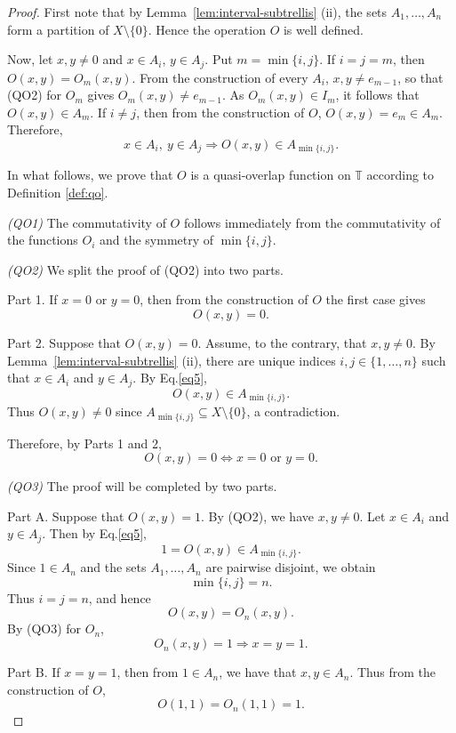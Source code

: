 \documentclass[preprint,12pt]{elsarticle}
\begin{document}
\begin{proof}
First note that by Lemma~\ref{lem:interval-subtrellis} (ii), the sets
$A_1,\ldots,A_n$ form a partition of $X\setminus\{0\}$.
Hence the operation $O$ is well defined.

Now, let $x,y\neq0$ and
$x\in A_i$, $y\in A_j$. Put
$
m=\min\{i,j\}.
$
If $i=j=m$, then
$
O(x,y)=O_m(x,y).
$
From the construction of every $A_i$, $x,y\neq e_{m-1}$, so that (QO2) for $O_m$ gives
$
O_m(x,y)\neq e_{m-1}.
$
As $O_m(x,y)\in I_m$, it follows that
$
O(x,y)\in A_m.
$
If $i\neq j$, then from the construction of $O$,
$
O(x,y)=e_m\in A_m.
$
Therefore,
\begin{equation}\label{eq5}
 x\in A_i,\ y\in A_j
 \Longrightarrow
 O(x,y)\in A_{\min\{i,j\}}.
\end{equation}

In what follows, we prove that $O$ is a quasi-overlap function on $\mathbb{T}$ according to Definition \ref{def:qo}.

\emph{(QO1)}
The commutativity of $O$ follows immediately from the
commutativity of the functions $O_i$ and the symmetry of
$\min\{i,j\}$.

\emph{(QO2)}
We split the proof of (QO2) into two parts.

Part 1. If $x=0$ or $y=0$, then from the construction of $O$ the first case gives
$$
 O(x,y)=0.
$$

Part 2. Suppose that $O(x,y)=0$. Assume, to the contrary, that
$x,y\neq0$. By Lemma~\ref{lem:interval-subtrellis} (ii), there are
unique indices $i,j\in\{1,\ldots,n\}$ such that
$
x\in A_i
$
and
$
y\in A_j.
$
By Eq.\eqref{eq5},
$$
 O(x,y)\in A_{\min\{i,j\}}.
$$
Thus $O(x,y)\neq 0$ since $A_{\min\{i,j\}}\subseteq X\setminus\{0\}$, a contradiction.

Therefore, by Parts 1 and 2,
$$
 O(x,y)=0
 \Longleftrightarrow
 x=0\mbox{ or }y=0.
$$

\emph{(QO3)}
The proof will be completed by two parts.

Part A. Suppose that $O(x,y)=1$. By (QO2), we have
$x,y\neq0$. Let
$
x\in A_i
$
and
$
y\in A_j.
$
Then by Eq.\eqref{eq5},
$$
 1=O(x,y)\in A_{\min\{i,j\}}.
$$
Since $1\in A_n$ and the sets $A_1,\ldots,A_n$ are pairwise
disjoint, we obtain
$$
 \min\{i,j\}=n.
$$
Thus $i=j=n$, and hence
$$
 O(x,y)=O_n(x,y).
$$
By (QO3) for $O_n$,
$$
 O_n(x,y)=1
 \Longrightarrow
 x=y=1.
$$

Part B. If $x=y=1$, then from $1\in A_n$, we have that $x,y\in A_n$. Thus from the construction of $O$,
$$
 O(1,1)=O_n(1,1)=1.
$$


\end{proof}
\end{document}
